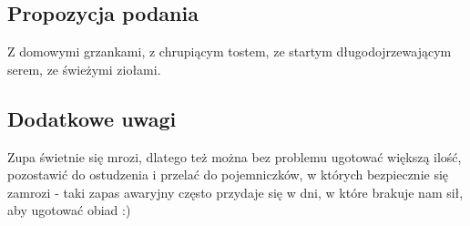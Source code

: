 \vspace{0.5cm}

\small
\subsection*{Propozycja podania}
Z domowymi grzankami, z chrupiącym tostem, ze startym długodojrzewającym serem, ze świeżymi ziołami.

\vspace{0.3cm}

\subsection*{Dodatkowe uwagi}
Zupa świetnie się mrozi, dlatego też można bez problemu ugotować większą ilość, pozostawić do ostudzenia i przelać do pojemniczków, w których bezpiecznie się zamrozi - taki zapas awaryjny często przydaje się w dni, w które brakuje nam sił, aby ugotować obiad :)

\newpage
